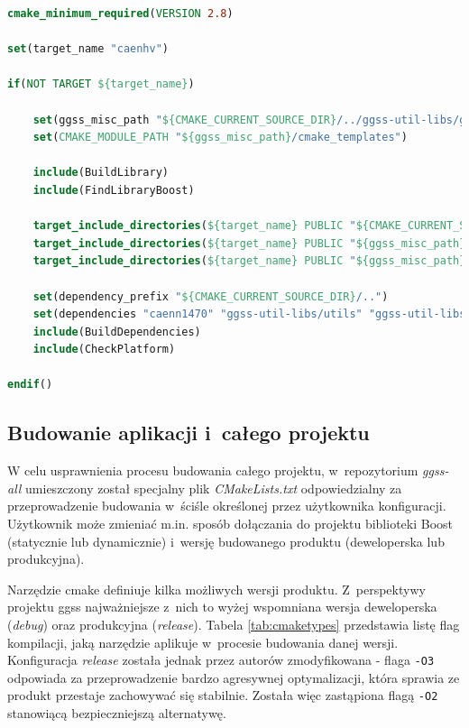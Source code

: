 \newpage

\begin{lstlisting}[language=cmake, caption={Plik \textit{CMakeLists.txt} służący do budowania biblioteki \textit{caenhv}. Widoczne zastosowanie m.in. plików \textit{BuildLibrary.cmake} oraz \textit{BuildDependencies.cmake}.},label={lst:caenhvcmake}]
cmake_minimum_required(VERSION 2.8)

set(target_name "caenhv")

if(NOT TARGET ${target_name})
   
    set(ggss_misc_path "${CMAKE_CURRENT_SOURCE_DIR}/../ggss-util-libs/ggss-misc")
    set(CMAKE_MODULE_PATH "${ggss_misc_path}/cmake_templates")

    include(BuildLibrary)
    include(FindLibraryBoost)

    target_include_directories(${target_name} PUBLIC "${CMAKE_CURRENT_SOURCE_DIR}/include/CaenHVLib")
    target_include_directories(${target_name} PUBLIC "${ggss_misc_path}/include")
    target_include_directories(${target_name} PUBLIC "${ggss_misc_path}")

    set(dependency_prefix "${CMAKE_CURRENT_SOURCE_DIR}/..")
    set(dependencies "caenn1470" "ggss-util-libs/utils" "ggss-util-libs/thread")
    include(BuildDependencies)
    include(CheckPlatform)

endif()
\end{lstlisting}



\subsection{Budowanie aplikacji i~całego projektu} 
W celu usprawnienia procesu budowania całego projektu, w~repozytorium \textit{ggss-all} umieszczony został specjalny plik \textit{CMakeLists.txt} odpowiedzialny za przeprowadzenie budowania w~ściśle określonej przez użytkownika konfiguracji. Użytkownik może zmieniać m.in. sposób dołączania do projektu biblioteki Boost (statycznie lub dynamicznie) i~wersję budowanego produktu (deweloperska lub produkcyjna). 

Narzędzie \gls*{cmake} definiuje kilka możliwych wersji produktu. Z~perspektywy projektu \gls*{ggss} najważniejsze z~nich to wyżej wspomniana wersja deweloperska (\textit{debug}) oraz produkcyjna (\textit{release}). Tabela \ref{tab:cmaketypes} przedstawia listę flag kompilacji, jaką narzędzie aplikuje w~procesie budowania danej wersji. Konfiguracja \textit{release} została jednak przez autorów zmodyfikowana - flaga \lstinline{-O3} odpowiada za przeprowadzenie bardzo agresywnej optymalizacji, która sprawia ze produkt przestaje zachowywać się stabilnie. Została więc zastąpiona flagą \lstinline{-O2} stanowiącą bezpieczniejszą alternatywę. 




